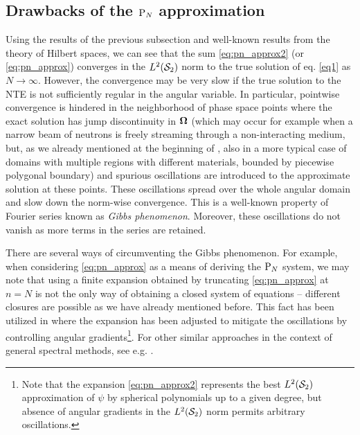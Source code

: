 \subsection{Drawbacks of the $\PN$ approximation}
Using the results of the previous subsection and well-known results from the theory of Hilbert spaces, we can see that
the sum \eqref{eq:pn_approx2} (or \eqref{eq:pn_approx}) converges in the $\Lp[2](\Sphere)$ norm to the true solution of
eq. \eqref{eq1} as $N\to\infty$. However, the convergence may be very slow if the true solution to the NTE is not
sufficiently regular in the angular variable. In particular, pointwise convergence is hindered in the neighborhood of
phase space points where the exact solution has jump discontinuity in $\bomega$ (which may occur for example
when a narrow beam of neutrons is freely streaming through a non-interacting medium, but, as we already mentioned at the
beginning of , also in a more typical case of domains with multiple regions with different materials,
bounded by piecewise polygonal boundary) and spurious oscillations are introduced to the approximate solution at these points.
These oscillations spread over the whole angular domain and slow down the norm-wise convergence. This is a well-known
property of Fourier series known as \textit{Gibbs
phenomenon}.
Moreover, these oscillations do not vanish as more terms in the series are retained. 

There are several ways of
circumventing the Gibbs phenomenon. For example, when considering \eqref{eq:pn_approx} as a means of deriving the $\PN$
system, we may note that using a finite expansion obtained by truncating \eqref{eq:pn_approx} at $n=N$ is not the only
way of obtaining a closed system of equations -- different closures are possible as we have already mentioned before.
This fact has been utilized in \cite{McClarren3} where the expansion has been adjusted to mitigate the oscillations by controlling
angular gradients\footnote{Note that the expansion \eqref{eq:pn_approx2} represents the best $\Lp[2](\Sphere)$
approximation of $\psi$ by spherical polynomials up to a given degree, but absence of angular gradients in the
$\Lp[2](\Sphere)$ norm permits arbitrary oscillations.}. For other similar approaches in the context of general spectral
methods, see e.g. \cite{Tanner}.

